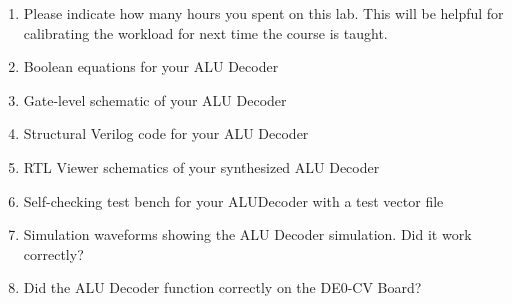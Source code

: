 \documentclass{e85}
\date{2019 February 11 (Monday)}
\author{}
\begin{document}
\begin{enumerate}
\item Please indicate how many hours you spent on this lab.  This will
  be helpful for calibrating the workload for next time the course is
  taught.

  \begin{solution}

  \end{solution}

\item Boolean equations for your ALU Decoder

  \begin{solution}

  \end{solution}

\item Gate-level schematic of your ALU Decoder

  \begin{solution}

  \end{solution}

\item Structural Verilog code for your ALU Decoder

  \begin{solution}

  \end{solution}

\item RTL Viewer schematics of your synthesized ALU Decoder

  \begin{solution}

  \end{solution}

\item Self-checking test bench for your ALUDecoder with a test vector
  file

  \begin{solution}

  \end{solution}

\item Simulation waveforms showing the ALU Decoder simulation.  Did it
  work correctly?

  \begin{solution}

  \end{solution}

\item Did the ALU Decoder function correctly on the DE0-CV Board?

  \begin{solution}

  \end{solution}
\end{enumerate}
\end{document}
